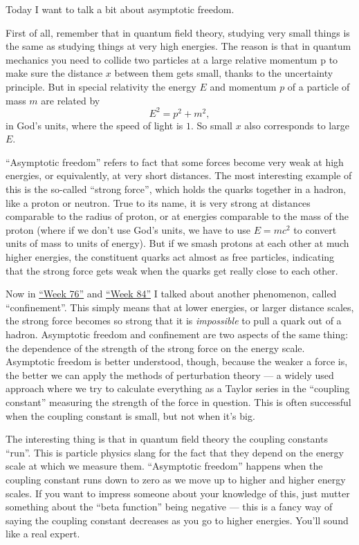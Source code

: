 \documentclass{article}
\begin{document}
Today I want to talk a bit about asymptotic freedom.

First of all, remember that in quantum field theory, studying very small
things is the same as studying things at very high energies. The reason
is that in quantum mechanics you need to collide two particles at a
large relative momentum p to make sure the distance \(x\) between them
gets small, thanks to the uncertainty principle. But in special
relativity the energy \(E\) and momentum \(p\) of a particle of mass
\(m\) are related by \[E^2 = p^2 + m^2,\] in God's units, where the
speed of light is \(1\). So small \(x\) also corresponds to large \(E\).

``Asymptotic freedom'' refers to fact that some forces become very weak
at high energies, or equivalently, at very short distances. The most
interesting example of this is the so-called ``strong force'', which
holds the quarks together in a hadron, like a proton or neutron. True to
its name, it is very strong at distances comparable to the radius of
proton, or at energies comparable to the mass of the proton (where if we
don't use God's units, we have to use \(E = mc^2\) to convert units of
mass to units of energy). But if we smash protons at each other at much
higher energies, the constituent quarks act almost as free particles,
indicating that the strong force gets weak when the quarks get really
close to each other.

Now in \protect\hyperlink{week76}{``Week 76''} and
\protect\hyperlink{week84}{``Week 84''} I talked about another
phenomenon, called ``confinement''. This simply means that at lower
energies, or larger distance scales, the strong force becomes so strong
that it is \emph{impossible} to pull a quark out of a hadron. Asymptotic
freedom and confinement are two aspects of the same thing: the
dependence of the strength of the strong force on the energy scale.
Asymptotic freedom is better understood, though, because the weaker a
force is, the better we can apply the methods of perturbation theory ---
a widely used approach where we try to calculate everything as a Taylor
series in the ``coupling constant'' measuring the strength of the force
in question. This is often successful when the coupling constant is
small, but not when it's big.

The interesting thing is that in quantum field theory the coupling
constants ``run''. This is particle physics slang for the fact that they
depend on the energy scale at which we measure them. ``Asymptotic
freedom'' happens when the coupling constant runs down to zero as we
move up to higher and higher energy scales. If you want to impress
someone about your knowledge of this, just mutter something about the
``beta function'' being negative --- this is a fancy way of saying the
coupling constant decreases as you go to higher energies. You'll sound
like a real expert.
\end{document}
